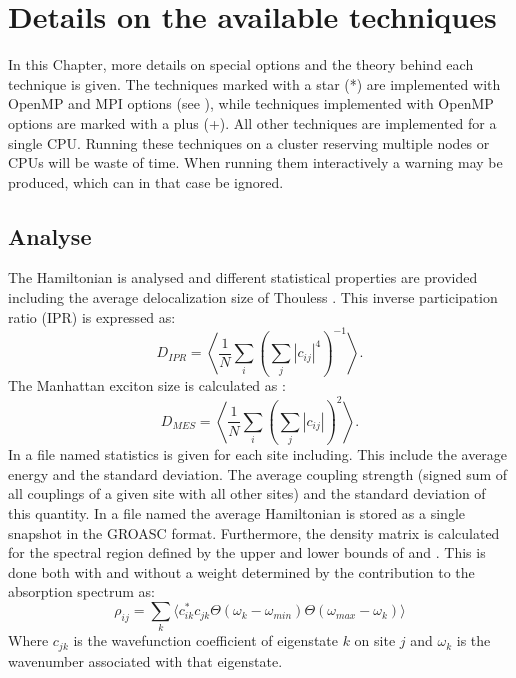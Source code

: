 \chapter{\label{chap:techniques}Details on the available techniques}
In this Chapter, more details on special options and the theory behind each technique is given.
The techniques marked with a star (*) are implemented with OpenMP and MPI options (see \cite{Sardjan_2020}), while techniques implemented with OpenMP options are marked with a plus (+).
All other techniques are implemented for a single CPU.
Running these techniques on a cluster reserving multiple nodes or CPUs will be waste of time.
When running them interactively a warning may be produced, which can in that case be ignored.

\section{Analyse}
The Hamiltonian is analysed and different statistical properties are provided including the average delocalization size of Thouless \cite{Thouless.1974.PR.13.93}.
This inverse participation ratio (IPR) is expressed as:
\begin{equation}
	D_{IPR}=\left\langle\frac{1}{N}\sum_i\left(\sum_j |c_{ij}|^{4}\right)^{-1}\right\rangle.
\end{equation}
The Manhattan exciton size is calculated as \cite{Jansen.2025.J.Chem.Phys..162.074113}:
\begin{equation}
	D_{MES}=\left\langle\frac{1}{N}\sum_i\left(\sum_j |c_{ij}|\right)^{2}\right\rangle.
\end{equation}
In a file named  statistics is given for each site including.
This include the average energy and the standard deviation.
The average coupling strength (signed sum of all couplings of a given site with all other sites) and the standard deviation of this quantity.
In a file named  the average Hamiltonian is stored as a single snapshot in the GROASC format.
Furthermore, the density matrix is calculated for the spectral region defined by the upper and lower bounds of  and .
This is done both with and without a weight determined by the contribution to the absorption spectrum as:
\begin{equation}
\rho_{ij}=\sum_k \Big\langle c_{ik}^* c_{jk}  \Theta(\omega_{k}-\omega_{min})\Theta(\omega_{max}-\omega_k)\Big\rangle
\end{equation}
Where $c_{jk}$ is the wavefunction coefficient of eigenstate $k$ on site $j$ and $\omega_k$ is the wavenumber associated with that eigenstate.
